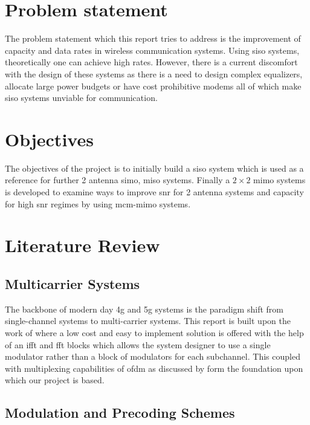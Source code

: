 \section[Problem statement]{\textbf{Problem statement}}
The problem statement which this report tries to address is the improvement of capacity and data rates in wireless communication systems. Using \acrshort{siso} systems, theoretically one can achieve high rates. However, there is a current discomfort with the design of these systems as there is a need to design complex equalizers, allocate large power budgets or have cost prohibitive modems all of which make  \acrshort{siso} systems unviable for communication.

\section[Objectives]{\textbf{Objectives}}
The objectives of the project is to initially build a \acrshort{siso} system which is used as a reference for further 2 antenna \acrshort{simo}, \acrshort{miso} systems. Finally a $2 \times 2$ \acrshort{mimo} systems is developed to examine ways to improve \acrshort{snr} for 2 antenna systems and capacity for high \acrshort{snr} regimes by using \acrshort{mcm}-\acrshort{mimo} systems.

\section{Literature Review}

\subsection{Multicarrier Systems}
The backbone of modern day \acrshort{4g} and \acrshort{5g} systems is the paradigm shift from single-channel systems to multi-carrier systems. This report is built upon the work of \textcite{Weinstein1971} where a low cost and easy to implement solution is offered with the help of an \acrshort{ifft} and \acrshort{fft} blocks which allows the system designer to use a single modulator rather than a block of modulators for each subchannel. This coupled with multiplexing capabilities of \acrshort{ofdm} as discussed by \textcite{Wu1995} form the foundation upon which our project is based.
 
\subsection{Modulation and Precoding Schemes}

